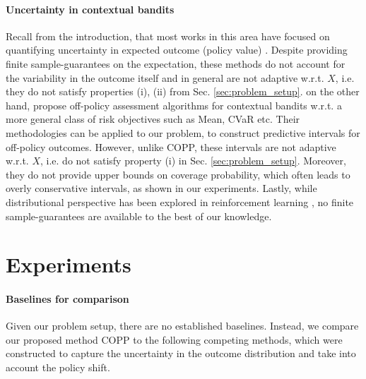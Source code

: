 \paragraph{Uncertainty in contextual bandits} Recall from the introduction, that most works in this area have focused on quantifying uncertainty in expected outcome (policy value) \citep{doubly-robust, uncertainty5}. Despite providing finite sample-guarantees on the expectation, these methods do not account for the variability in the outcome itself and in general are not adaptive w.r.t. $X$, i.e. they do not satisfy properties (i), (ii) from Sec. \ref{sec:problem_setup}. \cite{risk-assessment, chandak2021universal} on the other hand, propose off-policy assessment algorithms for contextual bandits w.r.t. a more general class of risk objectives such as Mean, CVaR etc. Their methodologies can be applied to our problem, to construct predictive intervals for off-policy outcomes. However, unlike COPP, these intervals are not adaptive w.r.t. $X$, i.e. do not satisfy property (i) in Sec. \ref{sec:problem_setup}. Moreover, they do not provide upper bounds on coverage probability, which often leads to overly conservative intervals, as shown in our experiments. Lastly, while distributional perspective has been explored in reinforcement learning \citep{distributional-rl}, no finite sample-guarantees are available to the best of our knowledge.


\section{Experiments} \label{sec:exp}



\paragraph{Baselines for comparison}
Given our problem setup, there are no established baselines. Instead, we compare our proposed method COPP to the following competing methods, which were constructed to capture the uncertainty in the outcome distribution and take into account the policy shift. 

